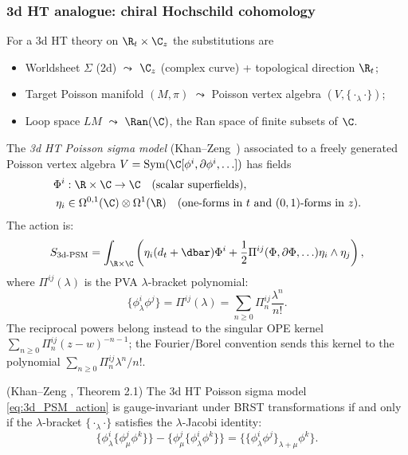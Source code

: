 \subsubsection{3d HT analogue: chiral Hochschild cohomology}
For a 3d HT theory on $\R_t \times \C_z$ the substitutions are
\begin{itemize}
\item Worldsheet $\Sigma$ (2d) $\leadsto$ $\C_z$ (complex curve) + topological direction $\R_t$;
\item Target Poisson manifold $(M, \pi)$ $\leadsto$ Poisson vertex algebra $(V, \{\cdot_\lambda \cdot\})$;
\item Loop space $LM$ $\leadsto$ $\Ran(\C)$, the Ran space of finite subsets of $\C$.
\end{itemize}
\begin{definition}
\label{def:3d_HT_PSM}
The \emph{3d HT Poisson sigma model} (Khan--Zeng~\cite{KZ25}) associated to a freely generated Poisson vertex algebra $V = \text{Sym}(\C[\phi^i, \partial \phi^i, \ldots])$ has fields
\begin{align}
\Phi^i &: \R \times \C \to \C \quad \text{(scalar superfields)}, \\
\eta_i &\in \Omega^{0,1}(\C) \otimes \Omega^1(\R) \quad \text{(one-forms in $t$ and $(0,1)$-forms in $z$)}.
\end{align}
The action is:
\begin{equation}
\label{eq:3d_PSM_action}
S_{\text{3d-PSM}} = \int_{\R \times \C} \left( \eta_i (d_t + \dbar) \Phi^i + \frac{1}{2} \Pi^{ij}(\Phi, \partial \Phi, \ldots) \eta_i \wedge \eta_j \right),
\end{equation}
where $\Pi^{ij}(\lambda)$ is the PVA $\lambda$-bracket polynomial:
\begin{equation}
\{\phi^i_\lambda \phi^j\} = \Pi^{ij}(\lambda)
= \sum_{n \geq 0}\Pi^{ij}_n\frac{\lambda^n}{n!}.
\end{equation}
The reciprocal powers belong instead to the singular OPE kernel
\(\sum_{n\ge0}\Pi^{ij}_n(z-w)^{-n-1}\); the Fourier/Borel convention
sends this kernel to the polynomial
\(\sum_{n\ge0}\Pi^{ij}_n\lambda^n/n!\).
\end{definition}

\begin{theorem}
\label{thm:KZ_gauge_invariance}
(Khan--Zeng \cite{KZ25}, Theorem 2.1) The 3d HT Poisson sigma model \eqref{eq:3d_PSM_action} is gauge-invariant under BRST transformations if and only if the $\lambda$-bracket $\{\cdot_\lambda \cdot\}$ satisfies the $\lambda$-Jacobi identity:
\begin{equation}
\{\phi^i_\lambda \{\phi^j_\mu \phi^k\}\} - \{\phi^j_\mu \{\phi^i_\lambda \phi^k\}\} = \{\{\phi^i_\lambda \phi^j\}_{\lambda + \mu} \phi^k\}.
\end{equation}
\end{theorem}

